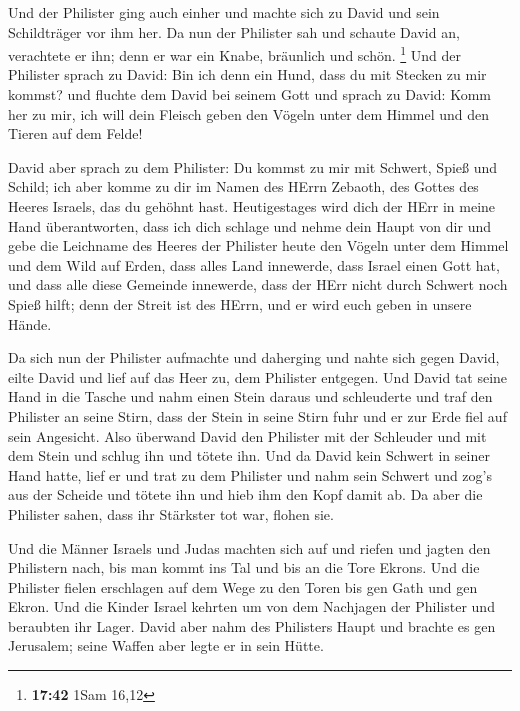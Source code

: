  Und der Philister ging auch einher und machte sich zu
David und sein Schildträger vor ihm her.  Da nun der
Philister sah und schaute David an, verachtete er ihn; denn er war ein
Knabe, bräunlich und schön. \footnote{\textbf{17:42} 1Sam 16,12}
 Und der Philister sprach zu David: Bin ich denn ein
Hund, dass du mit Stecken zu mir kommst? und fluchte dem David bei
seinem Gott  und sprach zu David: Komm her zu mir, ich
will dein Fleisch geben den Vögeln unter dem Himmel und den Tieren auf
dem Felde!

 David aber sprach zu dem Philister: Du kommst zu mir mit
Schwert, Spieß und Schild; ich aber komme zu dir im Namen des HErrn
Zebaoth, des Gottes des Heeres Israels, das du gehöhnt hast.
 Heutigestages wird dich der HErr in meine Hand
überantworten, dass ich dich schlage und nehme dein Haupt von dir und
gebe die Leichname des Heeres der Philister heute den Vögeln unter dem
Himmel und dem Wild auf Erden, dass alles Land innewerde, dass Israel
einen Gott hat,  und dass alle diese Gemeinde innewerde,
dass der HErr nicht durch Schwert noch Spieß hilft; denn der Streit ist
des HErrn, und er wird euch geben in unsere Hände.

 Da sich nun der Philister aufmachte und daherging und
nahte sich gegen David, eilte David und lief auf das Heer zu, dem
Philister entgegen.  Und David tat seine Hand in die
Tasche und nahm einen Stein daraus und schleuderte und traf den
Philister an seine Stirn, dass der Stein in seine Stirn fuhr und er zur
Erde fiel auf sein Angesicht.  Also überwand David den
Philister mit der Schleuder und mit dem Stein und schlug ihn und tötete
ihn. Und da David kein Schwert in seiner Hand hatte, 
lief er und trat zu dem Philister und nahm sein Schwert und zog's aus
der Scheide und tötete ihn und hieb ihm den Kopf damit ab. Da aber die
Philister sahen, dass ihr Stärkster tot war, flohen sie.

 Und die Männer Israels und Judas machten sich auf und
riefen und jagten den Philistern nach, bis man kommt ins Tal und bis an
die Tore Ekrons. Und die Philister fielen erschlagen auf dem Wege zu den
Toren bis gen Gath und gen Ekron.  Und die Kinder Israel
kehrten um von dem Nachjagen der Philister und beraubten ihr Lager.
 David aber nahm des Philisters Haupt und brachte es gen
Jerusalem; seine Waffen aber legte er in sein Hütte.

